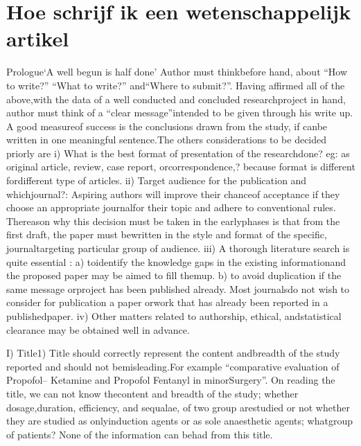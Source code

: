 \documentclass{article}
\begin{document}
	\section{Hoe schrijf ik een wetenschappelijk artikel}
	Prologue‘A well begun is half done’ Author must thinkbefore hand, about “How to write?” “What to write?” and“Where to submit?”. Having affirmed all of the above,with the data of a well conducted and concluded researchproject in hand, author must think of a “clear message”intended to be given through his write up. A good measureof success is the conclusions drawn from the study, if canbe written in one meaningful sentence.The others considerations to be decided priorly are
	i) What is the best format of presentation of the researchdone? eg: as  original article, review, case report, orcorrespondence,? because format is different fordifferent type of articles.
	ii) Target audience for the publication and whichjournal?: Aspiring authors will improve their chanceof acceptance if they choose an appropriate journalfor their topic and adhere to conventional rules. Thereason why this decision must be taken in the earlyphases is that from the first draft, the paper must bewritten in the style and format of the specific, journaltargeting particular group of audience.
	iii) A thorough literature search is quite essential : 
	a) toidentify the knowledge gaps in the existing informationand the proposed paper may be aimed to fill themup. 
	b) to avoid duplication if the same message orproject has been published already.  Most journalsdo not wish to consider for publication a paper orwork that has already been reported in a publishedpaper.
	iv) Other matters related to authorship, ethical,  andstatistical clearance may be obtained well in advance.
	
	
	I)  Title1) Title should correctly represent the content andbreadth of the study reported and should  not bemisleading.For example “comparative evaluation of  Propofol– Ketamine and Propofol Fentanyl  in minorSurgery”. On reading the title, we can not know thecontent and breadth of the study; whether dosage,duration, efficiency, and sequalae, of two group arestudied or not whether they are studied as onlyinduction agents or as sole anaesthetic agents; whatgroup of patients? None of the information can behad from this title.
	
\end{document}
